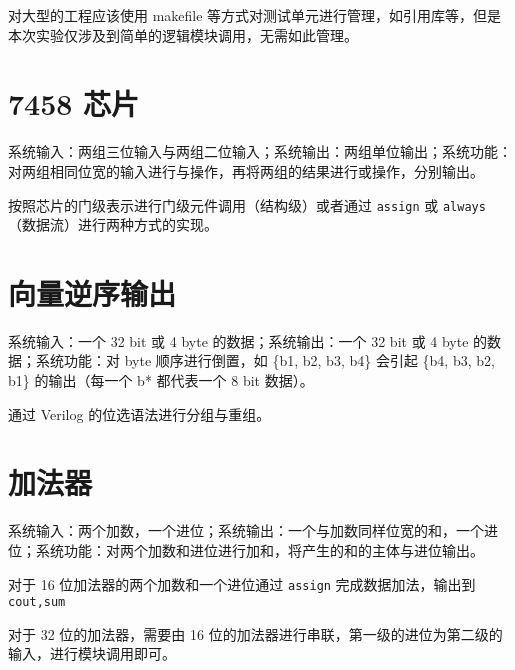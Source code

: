 \documentclass[lang=cn,11pt,a4paper,cite=authoryear]{elegantpaper}
\begin{document}
对大型的工程应该使用 makefile 等方式对测试单元进行管理，如引用库等，但是本次实验仅涉及到简单的逻辑模块调用，无需如此管理。

\section{7458 芯片}

系统输入：两组三位输入与两组二位输入；系统输出：两组单位输出；系统功能：对两组相同位宽的输入进行与操作，再将两组的结果进行或操作，分别输出。

按照芯片的门级表示进行门级元件调用（结构级）或者通过 \lstinline{assign} 或 \lstinline{always} （数据流）进行两种方式的实现。

\section{向量逆序输出}

系统输入：一个 32 bit 或 4 byte 的数据；系统输出：一个 32 bit 或 4 byte 的数据；系统功能：对 byte 顺序进行倒置，如 \{b1, b2, b3, b4\} 会引起 \{b4, b3, b2, b1\} 的输出（每一个 b* 都代表一个 8 bit 数据）。

通过 Verilog 的位选语法进行分组与重组。

\section{加法器}

系统输入：两个加数，一个进位；系统输出：一个与加数同样位宽的和，一个进位；系统功能：对两个加数和进位进行加和，将产生的和的主体与进位输出。

对于 16 位加法器的两个加数和一个进位通过 \lstinline{assign} 完成数据加法，输出到 \lstinline{cout,sum}

对于 32 位的加法器，需要由 16 位的加法器进行串联，第一级的进位为第二级的输入，进行模块调用即可。

\end{document}
